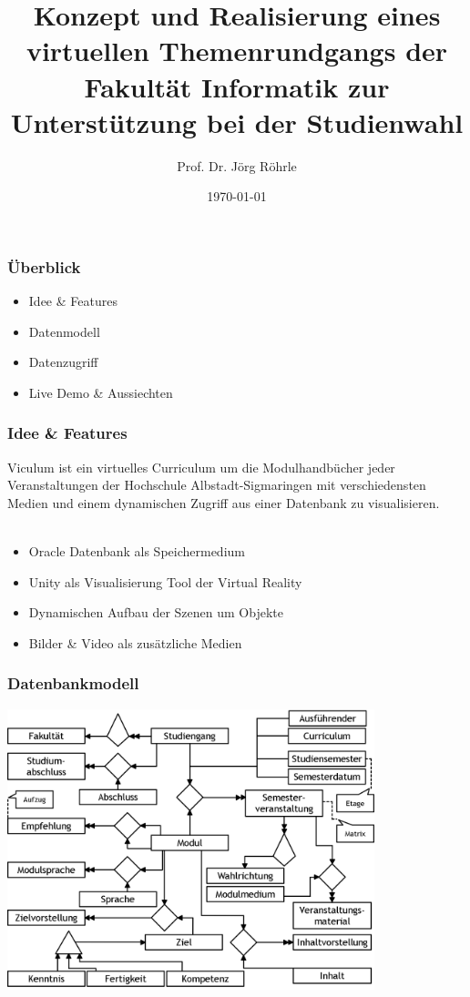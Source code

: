 \documentclass{beamer}
\title[Viculum]{Konzept und Realisierung eines virtuellen Themenrundgangs der Fakultät Informatik zur Unterstützung bei der Studienwahl} %
\author{Prof. Dr. Jörg Röhrle} %
\institute[HSALBSIG] %
{
Hochschule Albstadt-Sigamringen \\ %
\medskip
\textit{Domenico Milazzo (TI), milazzdo@hs-albsig.de} %
\newline
\textit{Maik Dürr (TI), duerrmai@hs-albsig.de} %
\newline
\textit{Fabian Altenberg (WIN), altenbfa@hs-albsig.de} %
\newline
}
\date{\today} %
\begin{document}
\begin{frame}
\titlepage %
\end{frame}

\begin{frame}
\frametitle{Überblick}
\begin{itemize}
\item Idee \& Features
\item Datenmodell
\item Datenzugriff
\item Live Demo \& Aussiechten
\end{itemize}
\end{frame}



\begin{frame}
\frametitle{Idee \& Features}
Viculum ist ein virtuelles Curriculum um die Modulhandbücher jeder Veranstaltungen der Hochschule Albstadt-Sigmaringen mit verschiedensten Medien und einem dynamischen Zugriff aus einer Datenbank zu visualisieren.\\~\\

\begin{itemize}
\item Oracle Datenbank als Speichermedium
\item Unity als Visualisierung Tool der Virtual Reality
\item Dynamischen Aufbau der Szenen um Objekte
\item Bilder \& Video als zusätzliche Medien
\end{itemize}
\end{frame}


\begin{frame}
\frametitle{Datenbankmodell}
\begin{center}
\includegraphics[width=0.8\textwidth]{pictures/Datenmodell_Viculum.png}
\end{center}
\end{frame}
\end{document}
